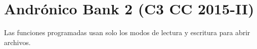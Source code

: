 \pagebreak[4]
\section{Andrónico Bank 2 (C3 CC 2015-II)}

  Las funciones programadas usan solo los modos
  de lectura y escritura para abrir archivos.
 
  
